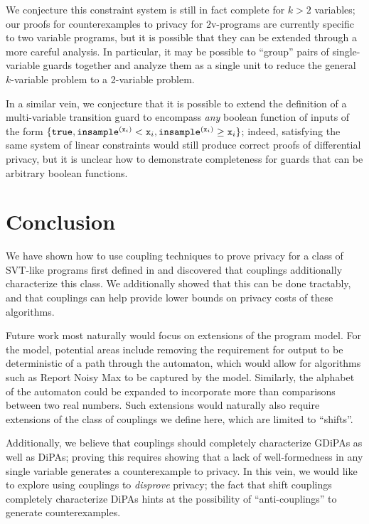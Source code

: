 We conjecture this constraint system is still in fact complete for $k>2$ variables; our proofs for counterexamples to privacy for $2$v-programs are currently specific to two variable programs, but it is possible that they can be extended through a more careful analysis. In particular, it may be possible to ``group'' pairs of single-variable guards together and analyze them as a single unit to reduce the general $k$-variable problem to a 2-variable problem. 

In a similar vein, we conjecture that it is possible to extend the definition of a multi-variable transition guard to encompass \textit{any} boolean function of inputs of the form $\{\texttt{true}, \mvlguard[\texttt{x}_i], \mvgguard[\texttt{x}_i]\}$; indeed, satisfying the same system of linear constraints would still produce correct proofs of differential privacy, but it is unclear how to demonstrate completeness for guards that can be arbitrary boolean functions. 


\section{Conclusion}
We have shown how to use coupling techniques to prove privacy for a class of SVT-like programs first defined in \cite{chadhaLinearTimeDecidability2021} and discovered that couplings additionally characterize this class. We additionally showed that this can be done tractably, and that couplings can help provide lower bounds on privacy costs of these algorithms. 

Future work most naturally would focus on extensions of the program model. For the model, potential areas include removing the requirement for output to be deterministic of a path through the automaton, which would allow for algorithms such as Report Noisy Max to be captured by the model. Similarly, the alphabet of the automaton could be expanded to incorporate more than comparisons between two real numbers. 
Such extensions would naturally also require extensions of the class of couplings we define here, which are limited to ``shifts''. 

Additionally, we believe that couplings should completely characterize GDiPAs as well as DiPAs; proving this requires showing that a lack of well-formedness in any single variable generates a counterexample to privacy. 
In this vein, we would like to explore using couplings to \textit{disprove} privacy; the fact that shift couplings completely characterize DiPAs hints at the possibility of ``anti-couplings'' to generate counterexamples.